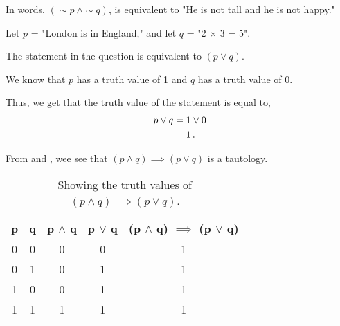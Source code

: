 %
%

\begin{subquestions}
	
	
\subquestion
	
In words, $(\sim p ~\land \sim q)$, is equivalent to "He is not tall and he is not happy."
	
	
\subquestion
	
Let $p$ = "London is in England," and let $q$ = "2 $\times$ 3 = 5". 

The statement in the question is equivalent to $(p \lor q)$. 
	
We know that $p$ has a truth value of 1 and $q$ has a truth value of 0. 
	
Thus, we get that the truth value of the statement is equal to,
\begin{align}
		p \lor q &= 1 \lor 0 \nonumber \\
		&= 1\,.
\end{align}
	
	
\subquestion
	
From  and , wee see that $(p \land q) \implies (p \lor q)$ is a tautology.
\begin{table}[ht]
		\centering
		\begin{tabular}{|c|c|c|c|c|}
			\hline
			p & q & p $\land$ q & p $\lor$ q & (p $\land$ q) $\implies$ (p $\lor$ q) \\
			\hline
			0 & 0 & 0 & 0 & 1 \\
			0 & 1 & 0 & 1 & 1 \\
			1 & 0 & 0 & 1 & 1 \\
			1 & 1 & 1 & 1 & 1 \\
			\hline
		\end{tabular}
		\caption{\label{2008:q2:tab:TruthTab1} Showing the truth values of $(p \land q) \implies (p \lor q)$.}
\end{table}
	

\end{subquestions}

